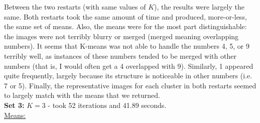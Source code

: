 \documentclass[submit]{harvardml}
\begin{document}
\noindent Between the two restarts (with same values of $K$), the results were largely the same. Both restarts took the same amount of time and produced, more-or-less, the same set of means. Also, the means were for the most part distinguishable: the images were not terribly blurry or merged (merged meaning overlapping numbers). It seems that K-means was not able to handle the numbers 4, 5, or 9 terribly well, as instances of these numbers tended to be merged with other numbers (that is, I would often get a 4 overlapped with 9). Similarly, 1 appeared quite frequently, largely because its structure is noticeable in other numbers (i.e. 7 or 5). Finally, the representative images for each cluster in both restarts seemed to largely match with the means that we returned.\\ 

\noindent\textbf{Set 3:} $K =3$ - took 52 iterations and 41.89 seconds. \\
\underline{Means:}\\
\end{document}
